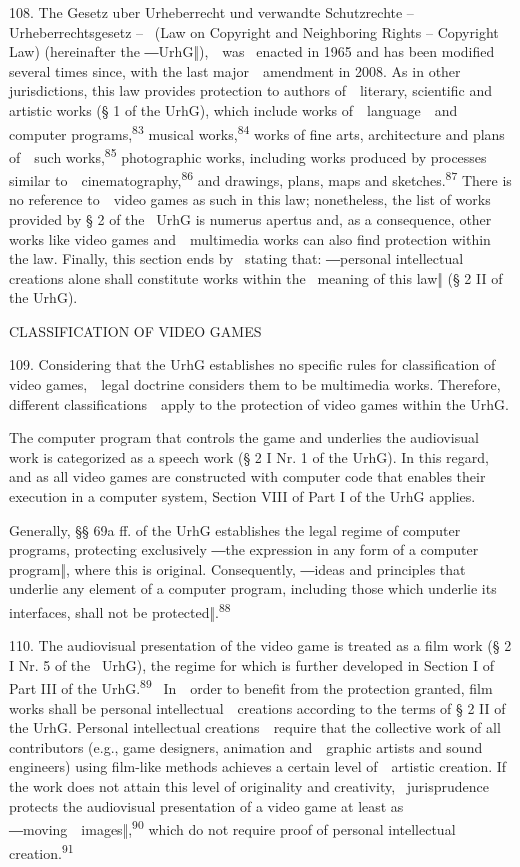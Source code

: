 \documentclass[
]{article}
\begin{document}
{108. }{The }{Gesetz uber Urheberrecht und verwandte Schutzrechte }{--
}{Urheberrechtsgesetz }{-- }{~(Law on Copyright and Neighboring Rights
}{-- }{Copyright Law) (hereinafter }{the ―}{UrhG}{‖),~~was }{~enacted in
1965 and has been modified several times since, with the last
major~~amendment in 2008. As in other jurisdictions, this law provides
protection to authors of~~literary, scientific and artistic works (§ 1
of the }{UrhG}{), which include works of~~language~~and computer
programs,}\textsuperscript{{83 }}{musical works,}\textsuperscript{{84
}}{works of fine arts, architecture and plans of~~such
works,}\textsuperscript{{85 }}{photographic works, including works
produced by processes similar to~~cinematography,}\textsuperscript{{86
}}{and drawings, plans, maps and sketches.}\textsuperscript{{87 }}{There
is no reference to~~video games }{as such }{in this law; nonetheless,
the list of works provided by § 2 of the }{~UrhG }{is }{numerus apertus
}{and, as a consequence, other works like video games and~~multimedia
works can also find protection within the law. Finally, this section
ends by }{~stating that: ―}{personal intellectual creations alone shall
constitute works within the }{~meaning of this law‖ }{(§ 2 II of the
}{UrhG}{)}{.}

{CLASSIFICATION OF VIDEO GAMES}

{109. }{Considering that the }{UrhG }{establishes no specific rules for
classification of video games,~~legal doctrine considers them to be
multimedia works. Therefore, different classifications~~apply to the
protection of video games within the }{UrhG}{.}

{The computer program that controls the game and underlies the
audiovisual work is categorized as a }{speech work }{(§ 2 I Nr. 1 of the
}{UrhG}{). In this regard, and as all video games are constructed with
computer code that enables their execution in a computer system, Section
VIII of Part I of the }{UrhG }{applies.}

{Generally, §§ 69a ff. of the }{UrhG }{establishes the legal regime of
computer programs, }{protecting exclusively ―}{the expression in any
form of a computer program‖}{, where this is original. }{Consequently,
―}{ideas and principles that underlie any element of a computer
}{program, including those which underlie its interfaces, shall not be
protected‖.}\textsuperscript{{88}}

{110. }{The audiovisual presentation of the video game is treated as a
}{film work }{(§ 2 I Nr. 5 of the }{~UrhG}{), the regime for which is
further developed in Section I of Part III of the
}{UrhG.}\textsuperscript{{89~~}}{In~~order to benefit from the
protection granted, film works shall be personal intellectual~~creations
according to the terms of § 2 II of the }{UrhG}{. Personal intellectual
creations~~require that the collective work of all contributors (e.g.,
game designers, animation and~~graphic artists and sound engineers)
using film-like methods achieves a certain level of~~artistic creation.
If the work does not attain this level of originality and creativity,
}{~jurisprudence protects the audiovisual presentation of a video game
at least as ―}{moving~~images}{‖,}\textsuperscript{{90 }}{which do not
require proof of personal intellectual creation.}\textsuperscript{{91}}
\end{document}
